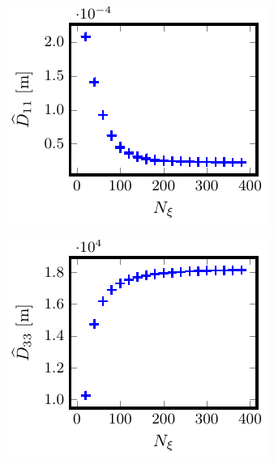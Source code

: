 \documentclass[10pt]{iopart}
\begin{document}
\begin{figure}[t]
	\centering
	\begin{subfigure}[t]{0.32\textwidth}
		\includegraphics{Convergence-Legendre-CIEMAT-QI-s0250-Er-1e-3-D11}
		\caption{}
		\label{subfig:D11_convergence_Legendre_CIEMAT_QI_0250_Erho_1e-3}
	\end{subfigure}
	\begin{subfigure}[t]{0.32\textwidth}
		\includegraphics{Convergence-Legendre-CIEMAT-QI-s0250-Er-1e-3-D33}
		\caption{}
		\label{subfig:D33_convergence_Legendre_CIEMAT_QI_0250_Erho_1e-3}
	\end{subfigure}
	

\end{figure}
\end{document}
